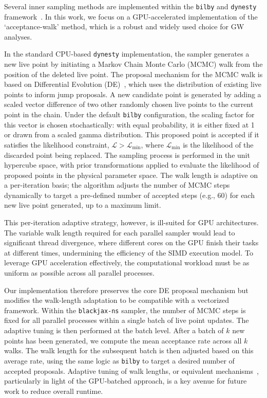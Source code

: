 \documentclass[fleqn,usenatbib]{mnras}
\begin{document}
Several inner sampling methods are implemented within the
\texttt{bilby} and \texttt{dynesty} framework~\citep{bilby_paper, dynesty}. In this work, we
focus on a GPU-accelerated implementation of the `acceptance-walk'
method, which is a robust and widely used choice for GW analyses.

In the standard CPU-based \texttt{dynesty} implementation, the sampler
generates a new live point by initiating a Markov Chain Monte Carlo
(MCMC) walk from the position of the deleted live point. 
The proposal mechanism for the MCMC walk is based on Differential
Evolution (DE)~\citep{DE, DE2}, which uses the distribution of existing live points to
inform jump proposals. A new candidate point is generated by adding a
scaled vector difference of two other randomly chosen live points to the
current point in the chain. Under the default \texttt{bilby} configuration, 
the scaling factor for this vector is chosen stochastically: with equal probability, 
it is either fixed at 1 or drawn from a scaled gamma distribution. This proposed 
point is accepted if it satisfies the likelihood constraint, $\mathcal{L} > \mathcal{L}_{\text{min}}$,
where $\mathcal{L}_{\text{min}}$ is the likelihood of the
discarded point being replaced. The sampling
process is performed in the unit hypercube space, with prior
transformations applied to evaluate the likelihood of proposed points in the physical parameter space. 
The walk length is adaptive on a per-iteration
basis; the algorithm adjusts the number of MCMC steps dynamically to
target a pre-defined number of accepted steps (e.g., 60) for each new
live point generated, up to a maximum limit.

This per-iteration adaptive strategy, however, is ill-suited for GPU
architectures. The variable walk length required for each parallel
sampler would lead to significant thread divergence, where different
cores on the GPU finish their tasks at different times, undermining the
efficiency of the SIMD execution model. To leverage GPU acceleration
effectively, the computational workload must be as uniform as possible
across all parallel processes.

Our implementation therefore preserves the core DE proposal mechanism but
modifies the walk-length adaptation to be compatible with a vectorized
framework. Within the \texttt{blackjax-ns} sampler, the number of MCMC
steps is fixed for all parallel processes within a single batch of
live point updates. The adaptive tuning is then performed at the batch
level. After a batch of $k$ new points has been generated, we compute
the mean acceptance rate across all $k$ walks. The walk length for the
subsequent batch is then adjusted based on this average rate,
using the same logic as \texttt{bilby} to target a desired number of
accepted proposals. Adaptive tuning of walk lengths, or equivalent 
mechanisms~\citep{dau2021wastefreesequentialmontecarlo}, particularly 
in light of the GPU-batched approach, is a key avenue for future work 
to reduce overall runtime.
\end{document}

